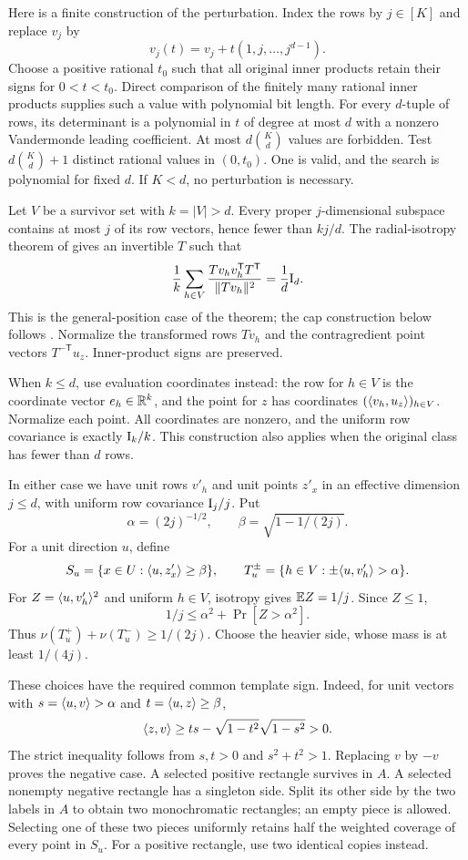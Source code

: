 Here is a finite construction of the perturbation. Index the rows by $j\in[K]$ and replace $v_j$ by
\[
 v_j(t)=v_j+t(1,j,\ldots,j^{d-1}).
\]
Choose a positive rational $t_0$ such that all original inner products retain their signs for $0<t<t_0$. Direct comparison of the finitely many rational inner products supplies such a value with polynomial bit length. For every $d$-tuple of rows, its determinant is a polynomial in $t$ of degree at most $d$ with a nonzero Vandermonde leading coefficient. At most $d\binom Kd$ values are forbidden. Test $d\binom Kd+1$ distinct rational values in $(0,t_0)$. One is valid, and the search is polynomial for fixed $d$. If $K<d$, no perturbation is necessary.

Let $V$ be a survivor set with $k=|V|>d$. Every proper $j$-dimensional subspace contains at most $j$ of its row vectors, hence fewer than $kj/d$. The radial-isotropy theorem of \citet{Forster02} gives an invertible $T$ such that
\begin{equation}
 \frac1k\sum_{h\in V}\frac{Tv_hv_h^{\mathsf T}T^{\mathsf T}}{\lVert Tv_h\rVert^2}
 =\frac1d\mathrm I_d.
\label{eq:radial}
\end{equation}
This is the general-position case of the theorem; the cap construction below follows \citet[Proposition 2.6]{HHPTZ22}. Normalize the transformed rows $Tv_h$ and the contragredient point vectors $T^{-\mathsf T}u_z$. Inner-product signs are preserved.

When $k\le d$, use evaluation coordinates instead: the row for $h\in V$ is the coordinate vector $e_h\in\mathbb R^k$, and the point for $z$ has coordinates $(\langle v_h,u_z\rangle)_{h\in V}$. Normalize each point. All coordinates are nonzero, and the uniform row covariance is exactly $\mathrm I_k/k$. This construction also applies when the original class has fewer than $d$ rows.

In either case we have unit rows $v'_h$ and unit points $z'_x$ in an effective dimension $j\le d$, with uniform row covariance $\mathrm I_j/j$. Put
\[
 \alpha=(2j)^{-1/2},\qquad \beta=\sqrt{1-1/(2j)}.
\]
For a unit direction $u$, define
\[
 S_u=\{x\in U:\langle u,z'_x\rangle\ge\beta\},\qquad
 T_u^\pm=\{h\in V:\pm\langle u,v'_h\rangle>\alpha\}.
\]
For $Z=\langle u,v'_h\rangle^2$ and uniform $h\in V$, isotropy gives $\mathbb E Z=1/j$. Since $Z\le1$,
\[
 1/j\le\alpha^2+\Pr[Z>\alpha^2].
\]
Thus $\nu(T_u^+)+\nu(T_u^-)\ge1/(2j)$. Choose the heavier side, whose mass is at least $1/(4j)$.

These choices have the required common template sign. Indeed, for unit vectors with $s=\langle u,v\rangle>\alpha$ and $t=\langle u,z\rangle\ge\beta$,
\[
 \langle z,v\rangle\ge ts-\sqrt{1-t^2}\sqrt{1-s^2}>0.
\]
The strict inequality follows from $s,t>0$ and $s^2+t^2>1$. Replacing $v$ by $-v$ proves the negative case. A selected positive rectangle survives in $A$. A selected nonempty negative rectangle has a singleton side. Split its other side by the two labels in $A$ to obtain two monochromatic rectangles; an empty piece is allowed. Selecting one of these two pieces uniformly retains half the weighted coverage of every point in $S_u$. For a positive rectangle, use two identical copies instead.

